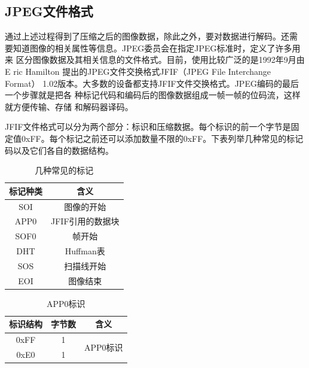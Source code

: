 \documentclass{article}
\numberwithin {equation}{section}
\begin{document}
\begin{spacing}{1.25}
  \subsection{JPEG文件格式}
    \vspace{1em}
    通过上述过程得到了压缩之后的图像数据，除此之外，要对数据进行解码。还需
    要知道图像的相关属性等信息。JPEG委员会在指定JPEG标准时，定义了许多用来
    区分图像数据及其相关信息的文件格式。目前，使用比较广泛的是1992年9月由E
    ric Hamilton 提出的JPEG文件交换格式JFIF（JPEG File Interchange Format）
    1.02版本。大多数的设备都支持JFIF文件交换格式。JPEG编码的最后一个步骤就是把各
    种标记代码和编码后的图像数据组成一帧一帧的位码流，这样就方便传输、存储
    和解码器译码。

    JFIF文件格式可以分为两个部分：标识和压缩数据。每个标识的前一个字节是固
    定值0xFF。每个标记之前还可以添加数量不限的0xFF。下表列举几种常见的标记
    码以及它们各自的数据结构。
    \begin{table}[H]
      \centering
      \caption{几种常见的标记}
      \begin{tabular}{cc}
        \toprule
        标记种类 & 含义\\
        \midrule
        SOI & 图像的开始\\
        APP0 & JFIF引用的数据块\\
        SOF0 & 帧开始\\
        DHT & Huffman表\\
        SOS & 扫描线开始\\
        EOI & 图像结束\\
        \bottomrule
      \end{tabular}
    \end{table}
    
    \begin{table}[H]
      \centering
      \caption{APP0标识}
      \begin{tabular}{ccc}
        \toprule
        标识结构 & 字节数 & 含义\\
        \midrule
        0xFF & 1 & \multirow{2}{*}{APP0标识}\\
        0xE0 & 1 &\\
        \bottomrule
      \end{tabular}
    \end{table}


\end{spacing}
\end{document}
